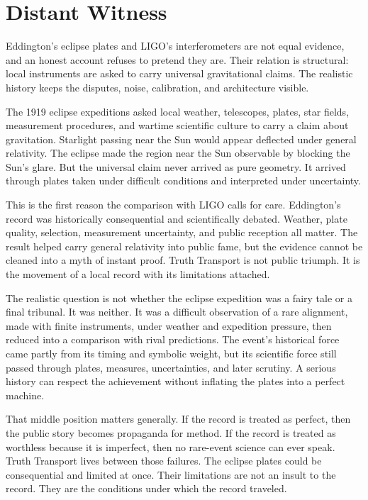 \section{Distant Witness}

Eddington's eclipse plates and LIGO's interferometers are not equal
evidence, and an honest account refuses to pretend they are. Their relation
is structural: local instruments are asked to carry universal gravitational
claims. The realistic history keeps the disputes, noise, calibration, and
architecture visible.

The 1919 eclipse expeditions asked local weather, telescopes, plates, star
fields, measurement procedures, and wartime scientific culture to carry a
claim about gravitation. Starlight passing near the Sun would appear
deflected under general relativity. The eclipse made the region near the
Sun observable by blocking the Sun's glare. But the universal claim never
arrived as pure geometry. It arrived through plates taken under difficult
conditions and interpreted under uncertainty.

This is the first reason the comparison with LIGO calls for care.
Eddington's record was historically consequential and scientifically
debated. Weather, plate quality, selection, measurement uncertainty, and
public reception all matter. The result helped carry general relativity
into public fame, but the evidence cannot be cleaned into a myth of instant
proof. Truth Transport is not public triumph. It is the movement of a local
record with its limitations attached.

The realistic question is not whether the eclipse expedition was a fairy
tale or a final tribunal. It was neither. It was a difficult observation of
a rare alignment, made with finite instruments, under weather and
expedition pressure, then reduced into a comparison with rival predictions.
The event's historical force came partly from its timing and symbolic
weight, but its scientific force still passed through plates, measures,
uncertainties, and later scrutiny. A serious history can respect the
achievement without inflating the plates into a perfect machine.

That middle position matters generally. If the record is treated as
perfect, then the public story becomes propaganda for method. If the record
is treated as worthless because it is imperfect, then no rare-event science
can ever speak. Truth Transport lives between those failures. The eclipse
plates could be consequential and limited at once. Their limitations are
not an insult to the record. They are the conditions under which the
record traveled.

